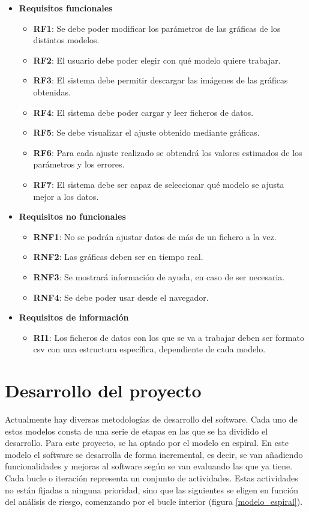 \begin{itemize}
\item \textbf{Requisitos funcionales}
	\begin{itemize}
	\item \textbf{RF1}: Se debe poder modificar los parámetros de las gráficas de los distintos modelos.
	\item \textbf{RF2}: El usuario debe poder elegir con qué modelo quiere trabajar.
	\item \textbf{RF3}: El sistema debe permitir descargar las imágenes de las gráficas obtenidas.
	\item \textbf{RF4}: El sistema debe poder cargar y leer ficheros de datos.
	\item \textbf{RF5}: Se debe visualizar el ajuste obtenido mediante gráficas.
	\item \textbf{RF6}: Para cada ajuste realizado se obtendrá los valores estimados de los parámetros y los errores.
	\item \textbf{RF7}: El sistema debe ser capaz de seleccionar qué modelo se ajusta mejor a los datos. 
	\end{itemize}
\item \textbf{Requisitos no funcionales}
	\begin{itemize}
	\item \textbf{RNF1}: No se podrán ajustar datos de más de un fichero a la vez.
	\item \textbf{RNF2}: Las gráficas deben ser en tiempo real.
	\item \textbf{RNF3}: Se mostrará información de ayuda, en caso de ser necesaria.
	\item \textbf{RNF4}: Se debe poder usar desde el navegador.
	\end{itemize}
\item \textbf{Requisitos de información}
	\begin{itemize}
	\item \textbf{RI1}: Los ficheros de datos con los que se va a trabajar deben ser formato csv con una estructura específica, dependiente de cada modelo.
	\end{itemize}
\end{itemize}

\section{Desarrollo del proyecto}

Actualmente hay diversas metodologías de desarrollo del software. Cada uno de estos modelos consta de una serie de etapas en las que se ha dividido el desarrollo. Para este proyecto, se ha optado por el modelo en espiral. En este modelo el software se desarrolla de forma incremental, es decir, se van añadiendo funcionalidades y mejoras al software según se van evaluando las que ya tiene. Cada bucle o iteración representa un conjunto de actividades. Estas actividades no están fijadas a ninguna prioridad, sino que las siguientes se eligen en función del análisis de riesgo, comenzando por el bucle interior (figura \eqref{modelo_espiral}).

